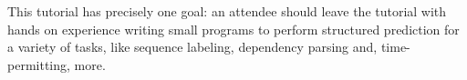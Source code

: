 This tutorial has precisely one goal: an attendee should leave the tutorial with hands on experience writing small programs to perform structured prediction for a variety of tasks, like sequence labeling, dependency parsing and, time-permitting, more.
